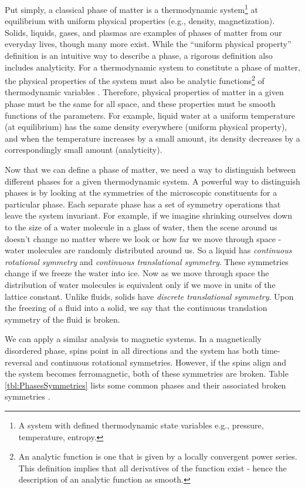 Put simply, a classical phase of matter is a thermodynamic system\footnote{A system with defined thermodynamic state variables e.g., pressure, temperature, entropy.} at equilibrium with uniform physical properties (e.g., density, magnetization). Solids, liquids, gases, and plasmas are examples of phases of matter from our everyday lives, though many more exist. While the ``uniform physical property'' definition is an intuitive way to describe a phase, a rigorous definition also includes analyticity. For a thermodynamic system to constitute a phase of matter, the physical properties of the system must also be analytic functions\footnote{An analytic function is one that is given by a locally convergent power series. This definition implies that all derivatives of the function exist - hence the description of an analytic function as smooth.} of thermodynamic variables \cite{Pathria2011}. Therefore, physical properties of matter in a given phase must be the same for all space, and these properties must be smooth functions of the parameters. For example, liquid water at a uniform temperature (at equilibrium) has the same density everywhere (uniform physical property), and when the temperature increases by a small amount, its density decreases by a correspondingly small amount (analyticity).

Now that we can define a phase of matter, we need a way to distinguish between different phases for a given thermodynamic system. A powerful way to distinguish phases is by looking at the symmetries of the microscopic constituents for a particular phase. Each separate phase has a set of symmetry operations that leave the system invariant. For example, if we imagine shrinking ourselves down to the size of a water molecule in a glass of water, then the scene around us doesn't change no matter where we look or how far we move through space - water molecules are randomly distributed around us. So a liquid has \textit{continuous rotational symmetry} and \textit{continuous translational symmetry}. These symmetries change if we freeze the water into ice. Now as we move through space the distribution of water molecules is equivalent only if we move in units of the lattice constant. Unlike fluids, solids have \textit{discrete translational symmetry}. Upon the freezing of a fluid into a solid, we say that the continuous translation symmetry of the fluid is broken. 

We can apply a similar analysis to magnetic systems. In a magnetically disordered phase, spins point in all directions and the system has both time-reversal and continuous rotational symmetries. However, if the spins align and the system becomes ferromagnetic, both of these symmetries are broken. Table \ref{tbl:PhasesSymmetries} lists some common phases and their associated broken symmetries \cite{Chaikin1995}.

